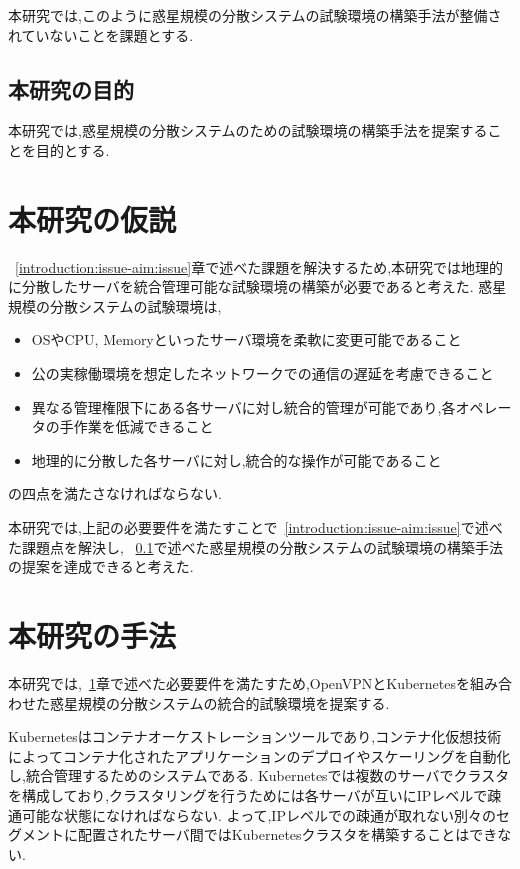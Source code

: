本研究では,このように惑星規模の分散システムの試験環境の構築手法が整備されていないことを課題とする.

\subsection{本研究の目的}
\label{introduction:issue-aim:aim}

本研究では,惑星規模の分散システムのための試験環境の構築手法を提案することを目的とする.

\section{本研究の仮説}
\label{introduction:hypothesis}

~\ref{introduction:issue-aim:issue}章で述べた課題を解決するため,本研究では地理的に分散したサーバを統合管理可能な試験環境の構築が必要であると考えた.
惑星規模の分散システムの試験環境は,
\begin{itemize}
  \item OSやCPU, Memoryといったサーバ環境を柔軟に変更可能であること
  \item 公の実稼働環境を想定したネットワークでの通信の遅延を考慮できること
  \item 異なる管理権限下にある各サーバに対し統合的管理が可能であり,各オペレータの手作業を低減できること
  \item 地理的に分散した各サーバに対し,統合的な操作が可能であること
\end{itemize}
の四点を満たさなければならない.

本研究では,上記の必要要件を満たすことで~\ref{introduction:issue-aim:issue}で述べた課題点を解決し,
~\ref{introduction:issue-aim:aim}で述べた惑星規模の分散システムの試験環境の構築手法の提案を達成できると考えた.

\section{本研究の手法}
\label{introduction:proposal}

本研究では,~\ref{introduction:hypothesis}章で述べた必要要件を満たすため,OpenVPNとKubernetesを組み合わせた惑星規模の分散システムの統合的試験環境を提案する.

Kubernetesはコンテナオーケストレーションツールであり,コンテナ化仮想技術によってコンテナ化されたアプリケーションのデプロイやスケーリングを自動化し,統合管理するためのシステムである.
Kubernetesでは複数のサーバでクラスタを構成しており,クラスタリングを行うためには各サーバが互いにIPレベルで疎通可能な状態になければならない.
よって,IPレベルでの疎通が取れない別々のセグメントに配置されたサーバ間ではKubernetesクラスタを構築することはできない.

